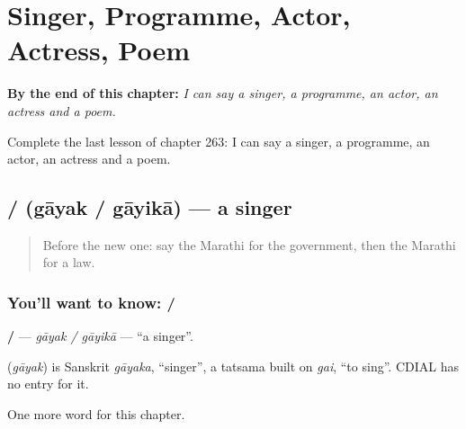 
\chapter{Singer, Programme, Actor, Actress, Poem}
\label{ch:mr-singer-programme-actor-actress-poem}

\begin{chapteropening}
\textbf{By the end of this chapter:} \emph{I can say a singer, a programme, an actor, an actress and a poem.}

Complete the last lesson of chapter 263: I can say a singer, a programme, an actor, an actress and a poem.
\end{chapteropening}

\section[\texorpdfstring{\mr{गायक} / \mr{गायिका} (gāyak / gāyikā)}{गायक / गायिका (gāyak / gāyikā)}]{ /  (gāyak / gāyikā) — a singer}

\label{lesson:MR-C263-gayak}



\begin{quote}
Before the new one: say the Marathi for the government, then the Marathi for a law.
\end{quote}

\subsection*{You'll want to know:  / }
\textbf{ / } — \emph{gāyak / gāyikā} — \textquotedblleft{}a singer\textquotedblright{}.

\begin{cousinweb}
\textbf{} (\emph{gāyak}) is Sanskrit \emph{gāyaka}, \textquotedblleft{}singer\textquotedblright{}, a tatsama built on \emph{gai}, \textquotedblleft{}to sing\textquotedblright{}. CDIAL has no entry for it.
\end{cousinweb}

\begin{grammarlens}[title={What you've built}]
One more word for this chapter.
\end{grammarlens}

